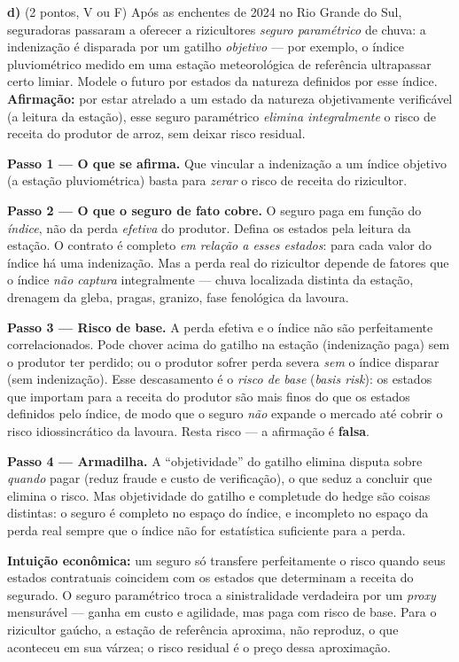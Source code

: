 \textbf{d)} (2 pontos, V ou F) Após as enchentes de 2024 no Rio Grande do Sul, seguradoras passaram a oferecer a rizicultores \emph{seguro paramétrico} de chuva: a indenização é disparada por um gatilho \emph{objetivo} --- por exemplo, o índice pluviométrico medido em uma estação meteorológica de referência ultrapassar certo limiar. Modele o futuro por estados da natureza definidos por esse índice. \textbf{Afirmação:} por estar atrelado a um estado da natureza objetivamente verificável (a leitura da estação), esse seguro paramétrico \emph{elimina integralmente} o risco de receita do produtor de arroz, sem deixar risco residual.

\begin{solucao}
\textbf{Passo 1 --- O que se afirma.} Que vincular a indenização a um índice objetivo (a estação pluviométrica) basta para \emph{zerar} o risco de receita do rizicultor.

\textbf{Passo 2 --- O que o seguro de fato cobre.} O seguro paga em função do \emph{índice}, não da perda \emph{efetiva} do produtor. Defina os estados pela leitura da estação. O contrato é completo \emph{em relação a esses estados}: para cada valor do índice há uma indenização. Mas a perda real do rizicultor depende de fatores que o índice \emph{não captura} integralmente --- chuva localizada distinta da estação, drenagem da gleba, pragas, granizo, fase fenológica da lavoura.

\textbf{Passo 3 --- Risco de base.} A perda efetiva e o índice não são perfeitamente correlacionados. Pode chover acima do gatilho na estação (indenização paga) sem o produtor ter perdido; ou o produtor sofrer perda severa \emph{sem} o índice disparar (sem indenização). Esse descasamento é o \emph{risco de base} (\emph{basis risk}): os estados que importam para a receita do produtor são mais finos do que os estados definidos pelo índice, de modo que o seguro \emph{não} expande o mercado até cobrir o risco idiossincrático da lavoura. Resta risco --- a afirmação é \textbf{falsa}.

\textbf{Passo 4 --- Armadilha.} A ``objetividade'' do gatilho elimina disputa sobre \emph{quando} pagar (reduz fraude e custo de verificação), o que seduz a concluir que elimina o risco. Mas objetividade do gatilho e completude do hedge são coisas distintas: o seguro é completo no espaço do índice, e incompleto no espaço da perda real sempre que o índice não for estatística suficiente para a perda.

\textbf{Intuição econômica:} um seguro só transfere perfeitamente o risco quando seus estados contratuais coincidem com os estados que determinam a receita do segurado. O seguro paramétrico troca a sinistralidade verdadeira por um \emph{proxy} mensurável --- ganha em custo e agilidade, mas paga com risco de base. Para o rizicultor gaúcho, a estação de referência aproxima, não reproduz, o que aconteceu em sua várzea; o risco residual é o preço dessa aproximação.
\end{solucao}

